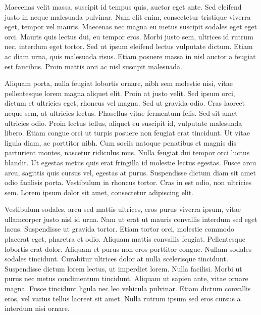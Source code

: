 Maecenas velit massa, suscipit id tempus quis, auctor eget ante.
Sed eleifend justo in neque malesuada pulvinar.
Nam elit enim, consectetur tristique viverra eget, tempor vel mauris.
Maecenas nec magna eu metus suscipit sodales eget eget orci.
Mauris quis lectus dui, eu tempor eros.
Morbi justo sem, ultrices id rutrum nec, interdum eget tortor.
Sed ut ipsum eleifend lectus vulputate dictum.
Etiam ac diam urna, quis malesuada risus.
Etiam posuere massa in nisl auctor a feugiat est faucibus.
Proin mattis orci ac nisl suscipit malesuada.

Aliquam porta, nulla feugiat lobortis ornare, nibh sem molestie nisi, vitae pellentesque lorem magna aliquet elit.
Proin at justo velit.
Sed ipsum orci, dictum et ultricies eget, rhoncus vel magna.
Sed ut gravida odio.
Cras laoreet neque sem, at ultricies lectus.
Phasellus vitae fermentum felis.
Sed sit amet ultricies odio.
Proin lectus tellus, aliquet eu suscipit id, vulputate malesuada libero.
Etiam congue orci ut turpis posuere non feugiat erat tincidunt.
Ut vitae ligula diam, ac porttitor nibh.
Cum sociis natoque penatibus et magnis dis parturient montes, nascetur ridiculus mus.
Nulla feugiat dui tempor orci luctus blandit.
Ut egestas metus quis erat fringilla id molestie lectus egestas.
Fusce arcu arcu, sagittis quis cursus vel, egestas at purus.
Suspendisse dictum diam sit amet odio facilisis porta.
Vestibulum in rhoncus tortor.
Cras in est odio, non ultricies sem.
Lorem ipsum dolor sit amet, consectetur adipiscing elit.

Vestibulum sodales, arcu sed mattis ultrices, eros purus viverra ipsum, vitae ullamcorper justo nisl id urna.
Nam ut erat ut mauris convallis interdum sed eget lacus.
Suspendisse ut gravida tortor.
Etiam tortor orci, molestie commodo placerat eget, pharetra et odio.
Aliquam mattis convallis feugiat.
Pellentesque lobortis erat dolor.
Aliquam et purus non eros porttitor congue.
Nullam sodales sodales tincidunt.
Curabitur ultrices dolor at nulla scelerisque tincidunt.
Suspendisse dictum lorem lectus, ut imperdiet lorem.
Nulla facilisi.
Morbi ut purus nec metus condimentum tincidunt.
Aliquam ut sapien ante, vitae ornare magna.
Fusce tincidunt ligula nec leo vehicula pulvinar.
Etiam dictum convallis eros, vel varius tellus laoreet sit amet.
Nulla rutrum ipsum sed eros cursus a interdum nisi ornare.

